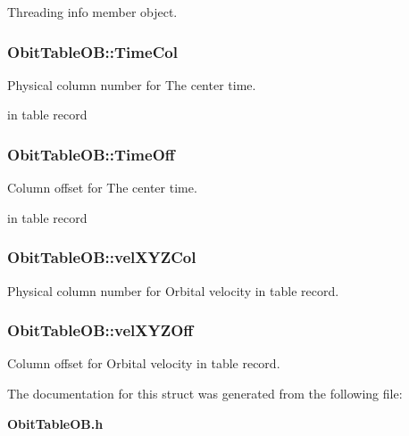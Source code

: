 Threading info member object. 

\subsubsection{ {\bf Obit\-Table\-OB::Time\-Col}}\label{structObitTableOB_o21}


Physical column number for The center time. 

in table record 
\subsubsection{ {\bf Obit\-Table\-OB::Time\-Off}}\label{structObitTableOB_o20}


Column offset for The center time. 

in table record 
\subsubsection{ {\bf Obit\-Table\-OB::vel\-XYZCol}}\label{structObitTableOB_o27}


Physical column number for Orbital velocity in table record. 

\subsubsection{ {\bf Obit\-Table\-OB::vel\-XYZOff}}\label{structObitTableOB_o26}


Column offset for Orbital velocity in table record. 



The documentation for this struct was generated from the following file:\begin{CompactItemize}
\item 
{\bf Obit\-Table\-OB.h}\end{CompactItemize}
